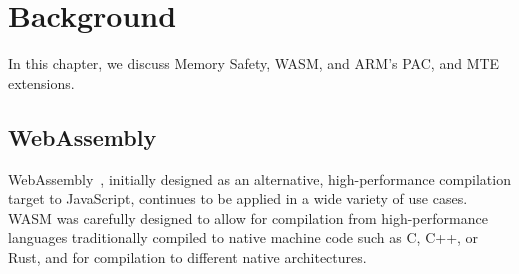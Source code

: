 \chapter{Background}
\label{ch:background}

In this chapter, we discuss Memory Safety, \ac{WASM}, and ARM's \ac{PAC}, and \ac{MTE} extensions.

\section{WebAssembly}
\label{sec:wasm}

WebAssembly~\cite{haas2017bringing}, initially designed as an alternative, high-performance compilation target to JavaScript, continues to be applied in a wide variety of use cases.
\Ac{WASM} was carefully designed to allow for compilation from high-performance languages traditionally compiled to native machine code such as C, C++, or Rust, and for compilation to different native architectures.
